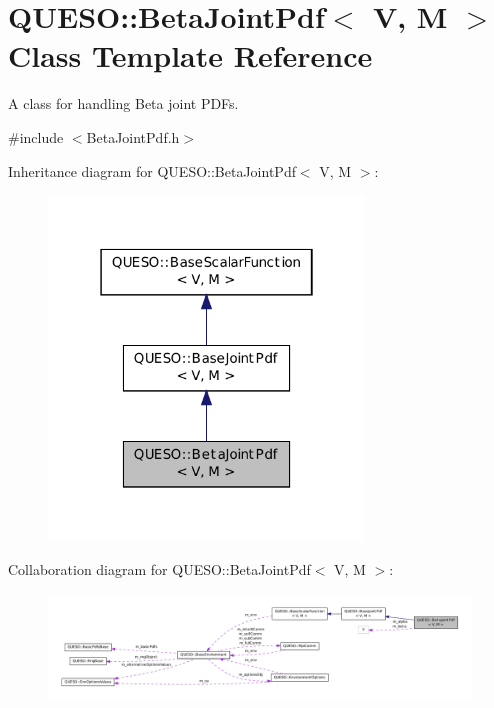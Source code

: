 \hypertarget{class_q_u_e_s_o_1_1_beta_joint_pdf}{\section{Q\-U\-E\-S\-O\-:\-:Beta\-Joint\-Pdf$<$ V, M $>$ Class Template Reference}
\label{class_q_u_e_s_o_1_1_beta_joint_pdf}
}


A class for handling Beta joint P\-D\-Fs.  




{\ttfamily \#include $<$Beta\-Joint\-Pdf.\-h$>$}



Inheritance diagram for Q\-U\-E\-S\-O\-:\-:Beta\-Joint\-Pdf$<$ V, M $>$\-:
\nopagebreak
\begin{figure}[H]
\begin{center}
\leavevmode
\includegraphics[width=238pt]{class_q_u_e_s_o_1_1_beta_joint_pdf__inherit__graph}
\end{center}
\end{figure}


Collaboration diagram for Q\-U\-E\-S\-O\-:\-:Beta\-Joint\-Pdf$<$ V, M $>$\-:
\nopagebreak
\begin{figure}[H]
\begin{center}
\leavevmode
\includegraphics[width=350pt]{class_q_u_e_s_o_1_1_beta_joint_pdf__coll__graph}
\end{center}
\end{figure}
